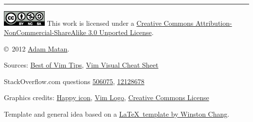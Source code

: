 \documentclass[10pt,landscape]{article}
\begin{document}
\begin{multicols}{3}
\begin{center}
\rule{0.3\linewidth}{0.25pt}
\end{center}


\includegraphics[width=6em]{by_nc_sa.eps} This work is licensed under a \href{http://creativecommons.org/licenses/by-nc-sa/3.0/}{Creative Commons Attribution-NonCommercial-ShareAlike 3.0 Unported License}.

{\copyright\ 2012 \href{http://matan.name}{Adam Matan}.}

\begin{tiny}
Sources: 	\href{http://rayninfo.co.uk/vimtips.html}{Best of Vim Tips},
			\href{http://people.csail.mit.edu/vgod/vim/vim-cheat-sheet-en.pdf}{Vim Visual Cheat Sheet}
			
StackOverflow.com questions \href{http://stackoverflow.com/questions/506075/how-do-i-fix-the-indentation-of-an-entire-file-in-vi}	{506075},
							\href{http://stackoverflow.com/questions/12128678/vim-go-to-beginning-end-of-next-method}				{12128678}

Graphics credits: 	\href{http://commons.wikimedia.org/wiki/File:Gnome-face-smile.svg}	{Happy icon},
					\href{http://en.wikipedia.org/wiki/File:Vimlogo.svg}				{Vim Logo},
					\href{http://creativecommons.org/about/downloads}					{Creative Commons License}



Template and general idea based on a \href{http://www.stdout.org/~winston/latex/}{\LaTeX\ template by Winston Chang}.
\end{tiny}




\end{multicols}
\end{document}
